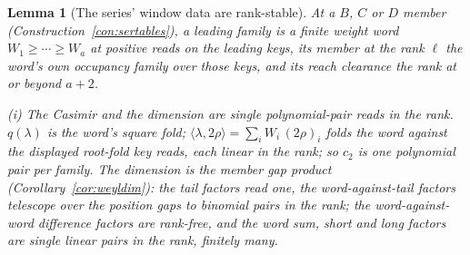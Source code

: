 \documentclass[11pt]{article}
\newtheorem{lemma}{Lemma}
\theoremstyle{definition}
\begin{document}
\begin{lemma}[The series' window data are rank-stable]
\label{lem:serstable}
At a $B$, $C$ or $D$ member (Construction~\ref{con:sertables}), a
\emph{leading family} is a finite weight word
$W_1\ge\cdots\ge W_a$ at positive reads on the leading keys, its
member at the rank $\ell$ the word's own occupancy family over
those keys, and its \emph{reach clearance} the rank at or beyond
$a+2$.

\emph{(i) The Casimir and the dimension are single
polynomial-pair reads in the rank.} $q(\lambda)$ is the word's
square fold; $\langle\lambda,2\rho\rangle=\sum_iW_i\,(2\rho)_i$
folds the word against the displayed root-fold key reads, each
linear in the rank; so $\hat c_2$ is one polynomial pair per
family. The dimension is the member gap product
(Corollary~\ref{cor:weyldim}): the tail factors read one, the
word-against-tail factors telescope over the position gaps to
binomial pairs in the rank; the word-against-word difference
factors are rank-free, and the word sum, short and long factors
are single linear pairs in the rank, finitely many.


\end{lemma}
\end{document}
